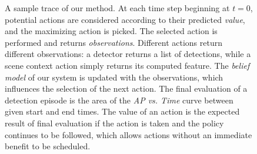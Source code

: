 \begin{figure}[ht!]
  \caption{
A sample trace of our method.
At each time step beginning at $t=0$, potential actions are considered according to their predicted \emph{value}, and the maximizing action is picked.
The selected action is performed and returns \emph{observations}.
Different actions return different observations: a detector returns a list of detections, while a scene context action simply returns its computed feature.
The \emph{belief model} of our system is updated with the observations, which influences the selection of the next action.
The final evaluation of a detection episode is the area of the \emph{AP vs. Time} curve between given start and end times.
The value of an action is the expected result of final evaluation if the action is taken and the policy continues to be followed, which allows actions without an immediate benefit to be scheduled.
}\label{fig:det_figure1}
\end{figure}
